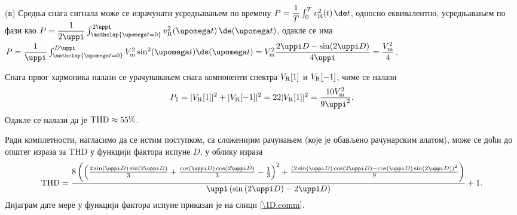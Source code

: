


(в) Средња снага сигнала може се израчунати усредњавањем по времену
$P = \dfrac{1}{T} \int_0^T v_{\rm R}^2(t) \, \de t$, односно еквивалентно, 
усредњавањем по фази као 
$P = \dfrac{1}{2\uppi} \int_{\mathclap{\upomega t = 0}}^{2\uppi} v_{\rm R}^2(\upomega t) \, \de(\upomega t)$, одакле се 
има 
$P = \dfrac{1}{\uppi} \int_{\mathclap{\upomega t = 0}}^{D\uppi} V_{\rm m}^2 \sin^2(\upomega t) \de (\upomega t) 
   = V_{\rm m}^2 \dfrac{2\uppi D - \sin(2\uppi D)}{4\uppi} = \dfrac{V_{\rm m}^2}{4}$.

Снага првог хармоника налази се урачунавањем снага компоненти спектра $V_{\rm R}[1]$ и $V_{\rm R}[-1]$, чиме се налази
\begin{equation}
    P_1 = |V_{\rm R}[1]|^2 + |V_{\rm R}[-1]|^2 = 2 2 |V_{\rm R}[1]|^2 
    = \dfrac{10 V_{\rm m}^2}{9\uppi^2}.
\end{equation}
Одакле се налази да је $\rm THD \approx 55\%$.

Ради комплетности, нагласимо да се истим поступком, са сложенијим рачунањем (које је обављено рачунарским алатом), 
може се доћи до општег израза за THD у функцији фактора испуне $D$, у облику израза
\small
\begin{equation}
    {\rm THD} = 
    {{8\left(\left({{2\sin (\uppi D)\sin \left(2\uppi
 D\right)}\over{3}}+{{\cos (\uppi D)\cos \left(2\uppi D
 \right)}\over{3}}-{{1}\over{3}}\right)^2+{{\left(2\sin \left(\uppi
 D\right)\cos \left(2\uppi D\right)-\cos (\uppi D)
 \sin \left(2\uppi D\right)\right)^2}\over{9}}\right)}\over{\uppi
 \left(\sin \left(2\uppi D\right)-2\uppi D\right)}}+1.
\end{equation}\normalsize
Дијаграм дате мере у функцији фактора испуне приказан је на слици \ref{\ID.comm}.

